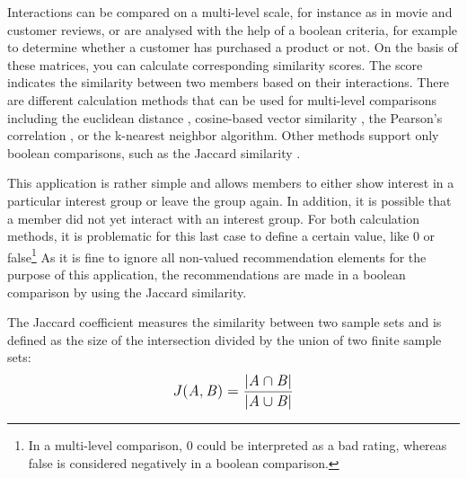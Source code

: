 \documentclass[12pt,numbers=noenddot,parskip,bibliography=totocnumbered,listof=totocnumbered,draft]{scrreprt}
\begin{document}
Interactions can be compared on a multi-level scale, for instance as in movie and customer reviews, or are analysed with the help of a boolean criteria, for example to determine whether a customer has purchased a product or not. On the basis of these matrices, you can calculate corresponding similarity scores. The score indicates the similarity between two members based on their interactions. There are different calculation methods that can be used for multi-level comparisons including the euclidean distance \citep[p.75]{klahold2009}, cosine-based vector similarity \citep[p.71]{klahold2009}, the Pearson's correlation \citep[p.72]{klahold2009}, or the k-nearest neighbor \citep[p.76]{klahold2009} algorithm. Other methods support only boolean comparisons, such as the Jaccard similarity \citep[p.74]{klahold2009}. 

This application is rather simple and allows members to either show interest in a particular interest group or leave the group again. In addition, it is possible that a member did not yet interact with an interest group. For both calculation methods, it is problematic for this last case to define a certain value, like 0 or false\footnote{In a multi-level comparison, 0 could be interpreted as a bad rating, whereas false is considered negatively in a boolean comparison.} As it is fine to ignore all non-valued recommendation elements for the purpose of this application, the recommendations are made in a boolean comparison by using the Jaccard similarity. 

The Jaccard coefficient measures the similarity between two sample sets and is defined as the size of the intersection divided by the union of two finite sample sets:
\[
\mathlarger{J(\mathit{A}, \mathit{B}) = \frac{|\mathit{A} \cap \mathit{B}|}{|\mathit{A} \cup \mathit{B}|}}
\] 
\end{document}
